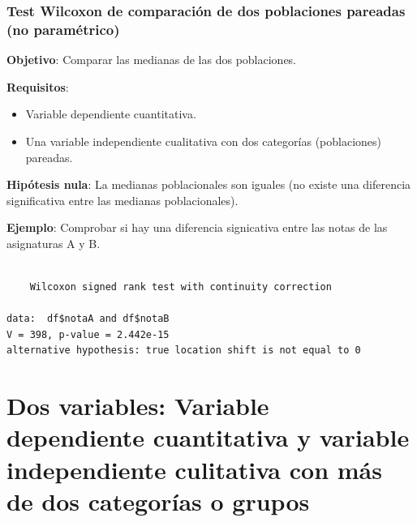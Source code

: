 \documentclass[
  a4paper,
]{scrreport}
\newenvironment{Shaded}{\begin{snugshade}}{\end{snugshade}}
\newcommand{\AttributeTok}[1]{\textcolor[rgb]{0.40,0.45,0.13}{#1}}
\newcommand{\ConstantTok}[1]{\textcolor[rgb]{0.56,0.35,0.01}{#1}}
\newcommand{\FunctionTok}[1]{\textcolor[rgb]{0.28,0.35,0.67}{#1}}
\newcommand{\NormalTok}[1]{\textcolor[rgb]{0.00,0.23,0.31}{#1}}
\newcommand{\SpecialCharTok}[1]{\textcolor[rgb]{0.37,0.37,0.37}{#1}}
\newcommand{\StringTok}[1]{\textcolor[rgb]{0.13,0.47,0.30}{#1}}
\providecommand{\tightlist}{%
  \setlength{\itemsep}{0pt}\setlength{\parskip}{0pt}}\usepackage{longtable,booktabs,array}
\theoremstyle{definition}
\theoremstyle{definition}
\theoremstyle{remark}
\begin{document}
\subsubsection{Test Wilcoxon de comparación de dos poblaciones pareadas
(no
paramétrico)}\label{test-wilcoxon-de-comparaciuxf3n-de-dos-poblaciones-pareadas-no-paramuxe9trico}

\textbf{Objetivo}: Comparar las medianas de las dos poblaciones.

\textbf{Requisitos}:

\begin{itemize}
\tightlist
\item
  Variable dependiente cuantitativa.
\item
  Una variable independiente cualitativa con dos categorías
  (poblaciones) pareadas.
\end{itemize}

\textbf{Hipótesis nula}: La medianas poblacionales son iguales (no
existe una diferencia significativa entre las medianas poblacionales).

\textbf{Ejemplo}: Comprobar si hay una diferencia signicativa entre las
notas de las asignaturas A y B.

\begin{Shaded}
\end{Shaded}

\begin{verbatim}

    Wilcoxon signed rank test with continuity correction

data:  df$notaA and df$notaB
V = 398, p-value = 2.442e-15
alternative hypothesis: true location shift is not equal to 0
\end{verbatim}

\section{Dos variables: Variable dependiente cuantitativa y variable
independiente culitativa con más de dos categorías o
grupos}\label{dos-variables-variable-dependiente-cuantitativa-y-variable-independiente-culitativa-con-muxe1s-de-dos-categoruxedas-o-grupos}
\end{document}
